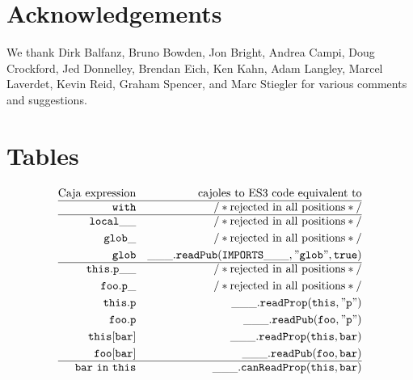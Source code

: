 \documentclass[letterpaper,twocolumn,10pt]{article}
\newcommand{\code}[1]{{\tt {#1}}}              %
\begin{document}

\section{Acknowledgements}

We thank 
Dirk Balfanz,
Bruno Bowden,
Jon Bright,
Andrea Campi,
Doug Crockford,
Jed Donnelley,
Brendan Eich,
Ken Kahn,
Adam Langley,
Marcel Laverdet,
Kevin Reid,
Graham Spencer,
and
Marc Stiegler
for various comments and suggestions.

\appendix

\section{Tables}

\begin{figure}
\begin{eqnarray}
  \mathrm{Caja\ expression} & \nonumber                 & \mathrm{cajoles\ to\ ES3\ code\ equivalent\ to} \\
  \hline
  \code{with}               & \label{with:bad}          & \mathrm{/*rejected\ in\ all\ positions*/} \\
  \hline
  \code{local\_\_}          & \label{var:bad-suffix}    & \mathrm{/*rejected\ in\ all\ positions*/} \\
  \code{glob\_}             & \label{var:bad-global-suffix} & \mathrm{/*rejected\ in\ all\ positions*/} \\
  \code{glob}               & \label{var:global}        & \code{\_\_\_.readPub(IMPORTS\_\_\_,"glob",true)} \\
  \hline
  \code{this.p\_\_}         & \label{read:bad-suffix}   & \mathrm{/*rejected\ in\ all\ positions*/} \\
  \code{foo.p\_}            & \label{read:bad-internal} & \mathrm{/*rejected\ in\ all\ positions*/} \\
  \code{this.p}             & \label{read:internal}     & \code{\_\_\_.readProp(this,"p")} \\
  \code{foo.p}              & \label{read:public}       & \code{\_\_\_.readPub(foo,"p")} \\
  \code{this[bar]}          & \label{read:index-internal} & \code{\_\_\_.readProp(this,bar)} \\
  \code{foo[bar]}           & \label{read:index-public} & \code{\_\_\_.readPub(foo,bar)} \\
  \hline
  \code{bar\ in\ this}      & \label{in:internal}       & \code{\_\_\_.canReadProp(this,bar)} \\

\end{eqnarray}
\end{figure}
\end{document}
